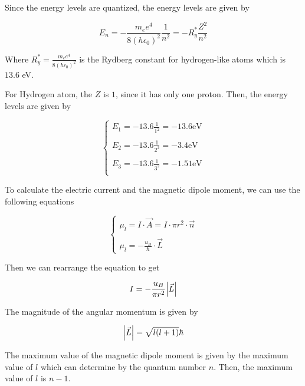 \documentclass{article}
\begin{document}
Since the energy levels are quantized, the energy levels are given by

\begin{equation}
  E_n = -\frac{m_e e^4}{8(h \epsilon_0)^2} \frac{1}{n^2} = - R^{*}_y \frac{Z^2}{n^2}
\end{equation}

Where $R^{*}_y = \frac{m_e e^4}{8(h \epsilon_0)^2}$ is the Rydberg constant for hydrogen-like atoms which is $13.6$ eV.

For Hydrogen atom, the $Z$ is $1$, since it has only one proton. Then, the energy levels are given by

\begin{equation}
  \begin{cases}
    \displaystyle
    E_1 = -13.6 \frac{1}{1^{2}} = -13.6 \text{eV} \\
    \\
    \displaystyle
    E_2 = -13.6 \frac{1}{2^{2}} = -3.4 \text{eV} \\
    \\
    \displaystyle
    E_3 = -13.6 \frac{1}{3^{2}} = -1.51 \text{eV} \\
  \end{cases}
\end{equation}

To calculate the electric current and the magnetic dipole moment, we can use the following equations

\begin{equation}
  \begin{cases}
  \displaystyle
  \mu_{l} = I \cdot \vec{A} = I \cdot \pi r^2 \cdot \vec{n} \\
  \\
  \displaystyle
  \mu_{l} = -\frac{u_B}{\hbar} \cdot \vec{L}
  \end{cases}
\end{equation}

Then we can rearrange the equation to get

\begin{equation}
  I = - \frac{u_B}{\pi r^{2}} \abs{\vec{L}}
\end{equation}

The magnitude of the angular momentum is given by

\begin{equation}
  \abs{\vec{L}} = \sqrt{l(l+1)} \hbar
\end{equation}

The maximum value of the magnetic dipole moment is given by the maximum value of $l$ which can determine
by the quantum number $n$. Then, the maximum value of $l$ is $n-1$. 
\end{document}
